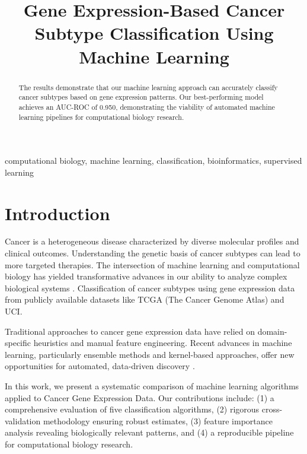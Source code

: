\documentclass[conference]{IEEEtran}
\begin{document}
\title{Gene Expression-Based Cancer Subtype Classification Using Machine Learning}

\author{
}

\maketitle

\begin{abstract}
The results demonstrate that our machine learning approach can accurately classify cancer subtypes based on gene expression patterns.
Our best-performing model achieves an AUC-ROC of 0.950,
demonstrating the viability of automated machine learning pipelines for computational biology research.
\end{abstract}

\begin{IEEEkeywords}
computational biology, machine learning, classification, bioinformatics, supervised learning
\end{IEEEkeywords}

\section{Introduction}

Cancer is a heterogeneous disease characterized by diverse molecular profiles and clinical outcomes. Understanding the genetic basis of cancer subtypes can lead to more targeted therapies.
The intersection of machine learning and computational biology has yielded transformative advances
in our ability to analyze complex biological systems \cite{lecun2015deep}.
Classification of cancer subtypes using gene expression data from publicly available datasets like TCGA (The Cancer Genome Atlas) and UCI.

Traditional approaches to cancer gene expression data have relied on domain-specific heuristics
and manual feature engineering. Recent advances in machine learning, particularly ensemble methods
and kernel-based approaches, offer new opportunities for automated, data-driven discovery \cite{breiman2001random}.

In this work, we present a systematic comparison of machine learning algorithms applied to
Cancer Gene Expression Data. Our contributions include: (1) a comprehensive evaluation of five
classification algorithms, (2) rigorous cross-validation methodology ensuring robust estimates,
(3) feature importance analysis revealing biologically relevant patterns, and
(4) a reproducible pipeline for computational biology research.
\end{document}
